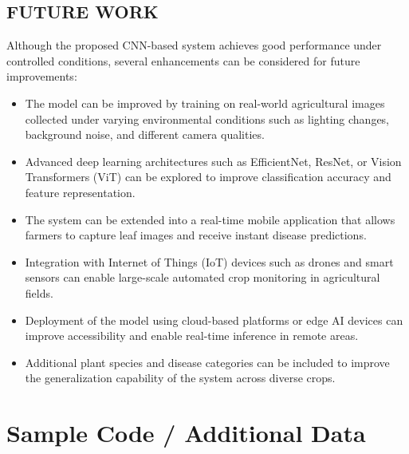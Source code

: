 \documentclass[12pt]{report}
\begin{document}
\section{FUTURE WORK}

Although the proposed CNN-based system achieves good performance under controlled conditions, several enhancements can be considered for future improvements:

\begin{itemize}
\item The model can be improved by training on real-world agricultural images collected under varying environmental conditions such as lighting changes, background noise, and different camera qualities.

\item Advanced deep learning architectures such as EfficientNet, ResNet, or Vision Transformers (ViT) can be explored to improve classification accuracy and feature representation.

\item The system can be extended into a real-time mobile application that allows farmers to capture leaf images and receive instant disease predictions.

\item Integration with Internet of Things (IoT) devices such as drones and smart sensors can enable large-scale automated crop monitoring in agricultural fields.

\item Deployment of the model using cloud-based platforms or edge AI devices can improve accessibility and enable real-time inference in remote areas.

\item Additional plant species and disease categories can be included to improve the generalization capability of the system across diverse crops.
\end{itemize}
\appendix
\chapter{Sample Code / Additional Data}
\end{document}
